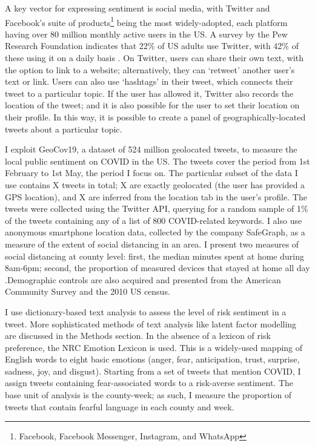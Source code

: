 \documentclass{article}
\begin{document}
A key vector for expressing sentiment is social media, with Twitter and Facebook's suite of products\footnote{Facebook, Facebook Messenger, Instagram, and WhatsApp} being the most widely-adopted, each platform having over 80 million monthly active users in the US. A survey by the Pew Research Foundation indicates that 22\% of US adults use Twitter, with 42\% of these using it on a daily basis \parencite{perrinShareAdultsUsing2019}. On Twitter, users can share their own text, with the option to link to a website; alternatively, they can `retweet' another user's text or link. Users can also use `hashtags' in their tweet, which connects their tweet to a particular topic. If the user has allowed it, Twitter also records the location of the tweet; and it is also possible for the user to set their location on their profile. In this way, it is possible to create a panel of geographically-located tweets about a particular topic. 

I exploit GeoCov19, a dataset of 524 million geolocated tweets, to measure the local public sentiment on COVID in the US. The tweets cover the period from 1st February to 1st May, the period I focus on. The particular subset of the data I use contains X tweets in total; X are exactly geolocated (the user has provided a GPS location), and X are inferred from the location tab in the user's profile. The tweets were collected using the Twitter API, querying for a random sample of 1\% of the tweets containing any of a list of 800 COVID-related keywords. I also use anonymous smartphone location data, collected by the company SafeGraph, as a measure of the extent of social distancing in an area. I present two measures of social distancing at county level: first, the median minutes spent at home during 8am-6pm; second, the proportion of measured devices that stayed at home all day \parencite{safegraphinc.SocialDistancingMetrics2020}.Demographic controls are also acquired and presented from the American Community Survey and the 2010 US census. 

I use dictionary-based text analysis to assess the level of risk sentiment in a tweet. More sophisticated methods of text analysis like latent factor modelling are discussed in the Methods section. In the absence of a lexicon of risk preference, the NRC Emotion Lexicon \parencite{mohammadCrowdsourcingWordEmotion2013} is used. This is a widely-used mapping of English words to eight basic emotions (anger, fear, anticipation, trust, surprise, sadness, joy, and disgust). Starting from a set of tweets that mention COVID, I assign tweets containing fear-associated words to a risk-averse sentiment. The base unit of analysis is the county-week; as such, I measure the proportion of tweets that contain fearful language in each county and week. 
\end{document}
